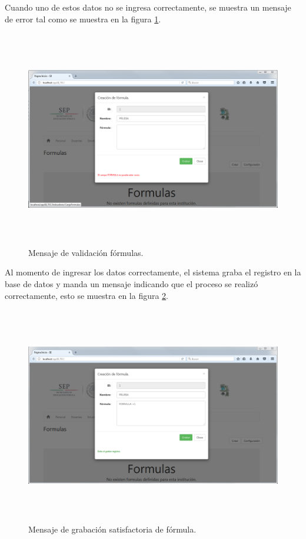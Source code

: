 			Cuando uno de estos datos no se ingresa correctamente, se muestra un mensaje de error tal como se muestra en la figura \ref{fig_FormulaValida}.\\

			\begin{figure}[]
		        \centering
		        \includegraphics[width=16cm, height=9.5cm]{figuras/FormulaValida}
		        \caption{Mensaje de validaci\'on f\'ormulas.}
		        \label{fig_FormulaValida}
		    \end{figure}

		    Al momento de ingresar los datos correctamente, el sistema graba el registro en la base de datos y manda un mensaje indicando que el proceso se realiz\'o correctamente, esto se muestra en la figura \ref{img_FormulasGraba}.\\

		    \begin{figure}[]
		        \centering
		        \includegraphics[width=16cm, height=9.5cm]{figuras/FormulasGraba}
		        \caption{Mensaje de grabaci\'on satisfactoria de f\'ormula.}
		        \label{img_FormulasGraba}
		    \end{figure}

